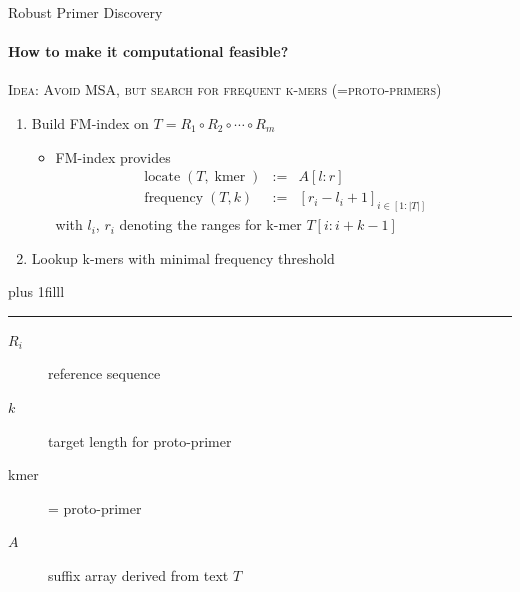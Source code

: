 \documentclass[xcolor=dvipsnames,envcountsect]{beamer}
\newcommand{\flushdown}{\vskip0pt plus 1filll}
\begin{document}
\begin{frame}{Robust Primer Discovery}
\framesubtitle{How to make it computational feasible?}
\begin{block}
	\scshape
Idea: Avoid MSA, but search for frequent k-mers (=proto-primers)
\end{block}
    \begin{enumerate}
        \item Build FM-index \cite{Ferragina2005} on $T = R_1 \circ  R_2 \circ \cdots \circ R_m$  %
        \begin{itemize}
            \item FM-index provides
            \begin{eqnarray*}
            \operatorname{locate} (T, \operatorname{kmer}) &:=& A[l:r]\\
            \operatorname{frequency} (T, k) &:=& [r_i - l_i + 1]_{i\in [1:|T|]}
            \end{eqnarray*}
            with $l_i$, $r_i$ denoting the ranges for k-mer $T[i:i+k-1]$
        \end{itemize}
        \item Lookup k-mers with minimal frequency threshold %
    \end{enumerate}
\flushdown
\rule{\textwidth}{.8pt} 
{\footnotesize
\begin{description}
    \item[$R_i$] reference sequence
    \item[$k$] target length for proto-primer
    \item[kmer] = proto-primer
    \item[$A$] suffix array derived from text $T$ 
\end{description}
}
\end{frame}
\end{document}
